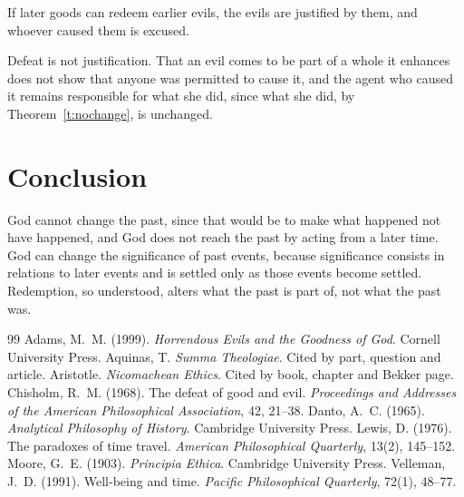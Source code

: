 \documentclass{situationist-preprint}
\begin{document}
\begin{objection}
If later goods can redeem earlier evils, the evils are justified by them, and whoever caused them is excused.
\end{objection}

\begin{reply}
Defeat is not justification. That an evil comes to be part of a whole it enhances does not show that anyone was permitted to cause it, and the agent who caused it remains responsible for what she did, since what she did, by Theorem~\ref{t:nochange}, is unchanged.
\end{reply}

\section{Conclusion}

God cannot change the past, since that would be to make what happened not have happened, and God does not reach the past by acting from a later time. God can change the significance of past events, because significance consists in relations to later events and is settled only as those events become settled. Redemption, so understood, alters what the past is part of, not what the past was.

\begin{thebibliography}{99}\small
{} Adams, M.~M. (1999). \emph{Horrendous Evils and the Goodness of God}. Cornell University Press.
 Aquinas, T. \emph{Summa Theologiae}. Cited by part, question and article.
 Aristotle. \emph{Nicomachean Ethics}. Cited by book, chapter and Bekker page.
 Chisholm, R.~M. (1968). The defeat of good and evil. \emph{Proceedings and Addresses of the American Philosophical Association}, 42, 21--38.
 Danto, A.~C. (1965). \emph{Analytical Philosophy of History}. Cambridge University Press.
 Lewis, D. (1976). The paradoxes of time travel. \emph{American Philosophical Quarterly}, 13(2), 145--152.
 Moore, G.~E. (1903). \emph{Principia Ethica}. Cambridge University Press.
 Velleman, J.~D. (1991). Well-being and time. \emph{Pacific Philosophical Quarterly}, 72(1), 48--77.
\end{thebibliography}
\end{document}
